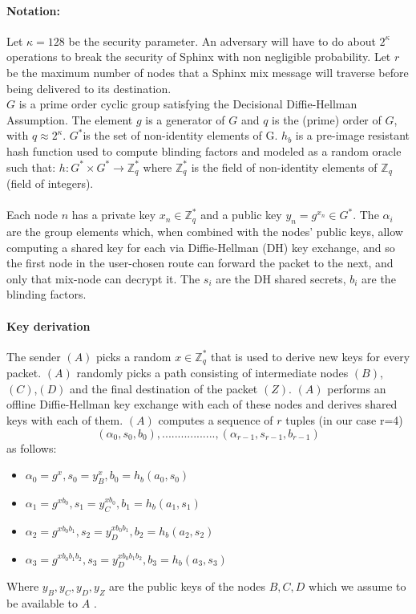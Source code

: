 \paragraph{Notation:}Let $\kappa=128$ be the security parameter. An adversary will have to do about $2^\kappa$ operations to break the security of Sphinx with non negligible probability.
Let $r$ be the maximum number of nodes that a Sphinx mix message will traverse before being delivered to its destination.
\\$G$ is a prime order cyclic group satisfying the Decisional Diffie-Hellman Assumption. The element $g$ is a generator of $G$ and $q$ is the (prime) order of $G$, with $q\approx2^{\kappa}$.
$G^*$is the set of non-identity elements of G. $h_b$ is a pre-image resistant hash function used to compute blinding factors and modeled as a random oracle such that:
$h:G^*\times G^*\rightarrow\mathbb{Z}^*_q$ where $\mathbb{Z}^*_q$ is the field of non-identity elements of $\mathbb{Z}_q$ (field of integers).
    \\~\\Each node $n$ has a private key $x_n\in \mathbb{Z}^*_q$ and a public key $y_n=g^{x_n}\in G^*$.
    The $\alpha_i$ are the group elements which, when combined with the nodes’ public keys, allow computing a shared key for each via Diffie-Hellman (DH) key exchange, and so the first node in the user-chosen route can forward the packet to the next, and only that mix-node can decrypt it.
    The $s_i$ are the DH shared secrets, $b_i$ are the blinding factors.

    \paragraph{Key derivation}
    The sender $(A)$ picks a random $x\in \mathbb{Z}^*_q$ that is used to derive new keys for every packet.
    \newline $(A)$ randomly picks a path consisting of intermediate nodes $(B)$, $(C)$,$(D)$ and the final destination of the packet $(Z)$.
    \newline $(A)$ performs an offline Diffie-Hellman key exchange with each of these nodes and derives shared keys with each of them.
    \newline $(A)$ computes a sequence of $r$ tuples (in our case r=4)  $$(\alpha_0,s_0,b_0),.................,(\alpha_{r-1},s_{r-1},b_{r-1})$$ as follows:
    \begin{itemize}
        \item $\alpha_0=g^x,s_0=y^x_B,b_0=h_b(a_0,s_0)$
        \item $\alpha_1=g^{xb_0},s_1=y^{xb_0}_C,b_1=h_b(a_1,s_1)$
        \item $\alpha_2=g^{xb_0b_1},s_2=y^{xb_0b_1}_D,b_2=h_b(a_2,s_2)$
        \item $\alpha_3=g^{xb_0b_1b_2},s_3=y^{xb_0b_1b_2}_D,b_3=h_b(a_3,s_3)$
    \end{itemize}
    Where $y_B,y_C,y_D,y_Z$ are the public keys of the nodes $B,C, D$  which we assume to be available to $A$ .
